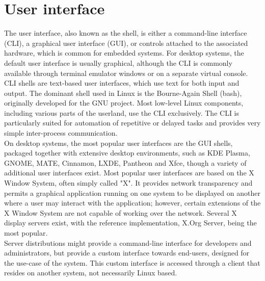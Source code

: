 \documentclass{article}
\begin{document}
\begin{center}
\end{center}

\section*{User interface}
\noindent
The user interface, also known as the shell, is either a command-line interface (CLI), a graphical user interface (GUI), or controls attached to the associated hardware, which is common for embedded systems. For desktop systems, the default user interface is usually graphical, although the CLI is commonly available through terminal emulator windows or on a separate virtual console.\\

CLI shells are text-based user interfaces, which use text for both input and output. The dominant shell used in Linux is the Bourne-Again Shell (bash), originally developed for the GNU project. Most low-level Linux components, including various parts of the userland, use the CLI exclusively. The CLI is particularly suited for automation of repetitive or delayed tasks and provides very simple inter-process communication.\\

On desktop systems, the most popular user interfaces are the GUI shells, packaged together with extensive desktop environments, such as KDE Plasma, GNOME, MATE, Cinnamon, LXDE, Pantheon and Xfce, though a variety of additional user interfaces exist. Most popular user interfaces are based on the X Window System, often simply called "X". It provides network transparency and permits a graphical application running on one system to be displayed on another where a user may interact with the application; however, certain extensions of the X Window System are not capable of working over the network. Several X display servers exist, with the reference implementation, X.Org Server, being the most popular.\\
Server distributions might provide a command-line interface for developers and administrators, but provide a custom interface towards end-users, designed for the use-case of the system. This custom interface is accessed through a client that resides on another system, not necessarily Linux based.\\
\end{document}
